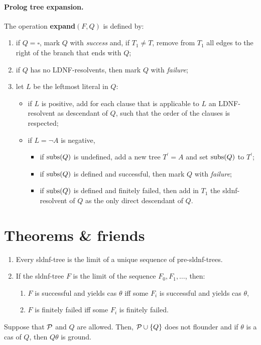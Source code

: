 \paragraph{Prolog tree expansion.}
The operation \textbf{expand}\((F,Q)\) is defined by:
\begin{enumerate}
    \item if \(Q = \square\), mark \(Q\) with \emph{success} and, if \(T_1 \ne T\), remove from \(T_1\) all edges to the right of the branch that ends with \(Q\);
    \item if \(Q\) has no LDNF-resolvents, then mark \(Q\) with \emph{failure};
    \item let \(L\) be the leftmost literal in \(Q\):
    \begin{itemize}
        \item if \(L\) is positive, add for each clause that is applicable to \(L\) an LDNF-resolvent as descendant of \(Q\), such that the order of the clauses is respected;
        \item if \(L = \neg A\) is negative,
        \begin{itemize}
            \item if \(\operatorname{subs}(Q)\) is undefined, add a new tree \(T^\prime = A\) and set \(\operatorname{subs}(Q)\) to \(T^\prime\);
            \item if \(\operatorname{subs}(Q)\) is defined and successful, then mark \(Q\) with \emph{failure};
            \item if \(\operatorname{subs}(Q)\) is defined and finitely failed, then add in \(T_1\) the  \gls{sldnf}-resolvent of \(Q\) as the only direct descendant of \(Q\).
        \end{itemize}
    \end{itemize}
\end{enumerate}

\section{Theorems \& friends}

\begin{thm}
    \begin{enumerate}
        \item Every \gls{sldnf}-tree is the limit of a unique sequence of pre-\gls{sldnf}-trees.
        \item If the \gls{sldnf}-tree \(F\) is the limit of the sequence \(F_0,F_1,\dotsc\), then:
        \begin{enumerate}
            \item \(F\) is successful and yields \gls{cas} \(\theta\) iff some \(F_i\) is successful and yields \gls{cas} \(\theta\),
            \item \(F\) is finitely failed iff some \(F_i\) is finitely failed.
        \end{enumerate}
    \end{enumerate}
\end{thm}

\begin{thm}
    Suppose that \(\mathcal{P}\) and \(Q\) are allowed.
    Then, \(\mathcal{P} \cup \lbrace Q \rbrace\) does not flounder and if \(\theta\) is a \gls{cas} of \(Q\), then \(Q\theta\) is ground.
\end{thm}